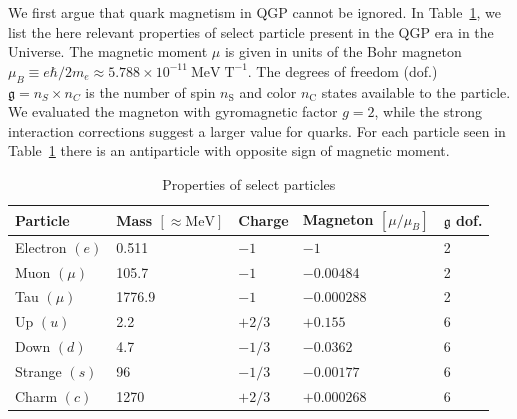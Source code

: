 \documentclass[epjST]{svjour}
\begin{document}
We first argue that quark magnetism in QGP cannot be ignored. In Table~\ref{tab:particle_properties}, we list the here relevant properties of select particle present in the QGP era in the Universe. The magnetic moment \(\mu\) is given in units of the Bohr magneton \(\mu_{B}\equiv e\hbar/2m_{e}\approx5.788\times10^{-11}\ \mathrm{MeV\;T}^{-1}\). The degrees of freedom (dof.) \(\mathfrak{g}=n_{S}\times n_{C}\) is the number of spin \(n_\mathrm{S}\) and color \(n_\mathrm{C}\) states available to the particle. We evaluated the magneton with gyromagnetic factor \(g=2\), while the strong interaction corrections suggest a larger value for quarks. For each particle seen in Table~\ref{tab:particle_properties} there is an antiparticle with opposite sign of magnetic moment. 
\begin{table}[h]
    \centering
    \caption{Properties of select particles}
    \label{tab:particle_properties}
    \begin{tabular}{@{}lllll@{}}
        \toprule
        \textbf{Particle} & \textbf{Mass} \([\approx\mathrm{MeV}]\) & \textbf{Charge} & \textbf{Magneton} \([\mu/\mu_{B}]\) & \(\mathfrak{g}\) \textbf{dof.} \\ 
        \midrule
        Electron  \((e)\)   & 0.511  & \(-1\)    & \(-1\)         & 2 \\
        Muon      \((\mu)\) & 105.7  & \(-1\)    & \(-0.00484\)   & 2 \\
        Tau       \((\mu)\) & 1776.9 & \(-1\)    & \(-0.000288\)   & 2 \\
        \midrule
        Up        \((u)\)   & 2.2    & \(+2/3\)  & \(+0.155\)     & 6 \\
        Down      \((d)\)   & 4.7    & \(-1/3\)  & \(-0.0362\)    & 6 \\
        Strange   \((s)\)   & 96     & \(-1/3\)  & \(-0.00177\)   & 6 \\
        Charm     \((c)\)   & 1270   & \(+2/3\)  & \(+0.000268\)  & 6 \\ 
        \bottomrule
    \end{tabular}
\end{table}
\end{document}
